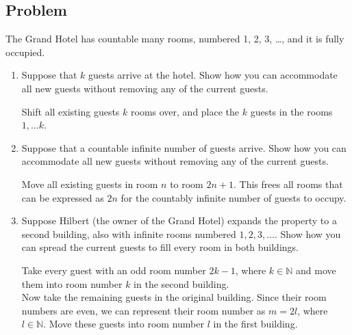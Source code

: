 \documentclass{article}
\begin{document}
    \subsection{Problem}
         The Grand Hotel has countable many rooms, numbered 1, 2, 3, \dots, and it is fully occupied.
    \begin{enumerate}
        \item Suppose that $k$ guests arrive at the hotel. Show how you can accommodate all new guests without removing any of the current guests.
    \begin{mdframed}
    Shift all existing guests $k$ rooms over, and place the $k$ guests in the rooms $1, \dots k$.
    \end{mdframed}
        \item Suppose that a countable infinite number of guests arrive. Show how you can accommodate all new guests without removing any of the current guests.
    \begin{mdframed}
    Move all existing guests in room $n$ to room $2n + 1$. This frees all rooms that can be expressed as $2n$ for the countably infinite number of guests to occupy.
    \end{mdframed}
        \item Suppose Hilbert (the owner of the Grand Hotel) expands the property to a second building, also with infinite rooms numbered $1, 2, 3, \dots$. Show how you can spread the current guests to fill every room in both buildings.
    \begin{mdframed}
    Take every guest with an odd room number $2k - 1$, where $k \in \mathbb{N}$ and move them into room number $k$ in the second building. \\
        Now take the remaining guests in the original building. Since their room numbers are even, we can represent their room number as $m = 2l$, where $l \in \mathbb{N}$. Move these guests into room number $l$ in the first building.
    \end{mdframed}
    \end{enumerate}
\end{document}
